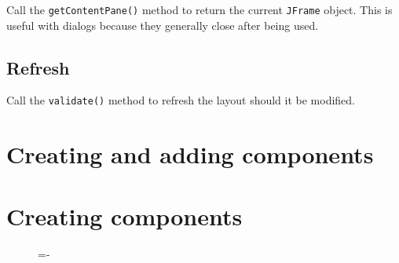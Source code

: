 \documentclass[a4paper]{systems-software}
\begin{document}
Call the \texttt{getContentPane()} method to return the current \texttt{JFrame} object. This is useful with dialogs because they generally close after being used.


\subsection*{Refresh}

Call the \texttt{validate()} method to refresh the layout should it be modified.


\newpage

\section{Creating and adding components}

\section*{Creating components}

\begin{figure}[H]
	\lineskip=-\fboxrule
\end{figure}
\end{document}
